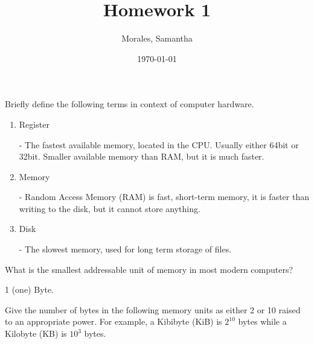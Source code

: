 \documentclass{homework}
\author{Morales, Samantha}
\date{\today}
\title{Homework 1}
\begin{document}
 \maketitle

\question Briefly define the following terms in context of computer
hardware.


\begin{enumerate}
  \item Register 
    \begin{sol}
    - The fastest available memory, located in the CPU. Usually either 64bit or 32bit. Smaller available memory than RAM, but it is much faster.
    \end{sol}
  \item Memory
    \begin{sol}
      - Random Access Memory (RAM) is fast, short-term memory, it is faster than writing to the disk, but it cannot store anything.
    \end{sol}
  \item Disk
    \begin{sol}
      - The slowest memory, used for long term storage of files. 
    \end{sol}
\end{enumerate}

\question What is the smallest addressable unit of memory in most modern
computers? \\
\begin{sol}
  1 (one) Byte.
\end{sol}

\question Give the number of bytes in the following memory units as either 2
or 10 raised to an appropriate power. For example, a Kibibyte
(KiB) is $2^{10}$ bytes while a Kilobyte (KB) is $10^3$ bytes.
\end{document}
